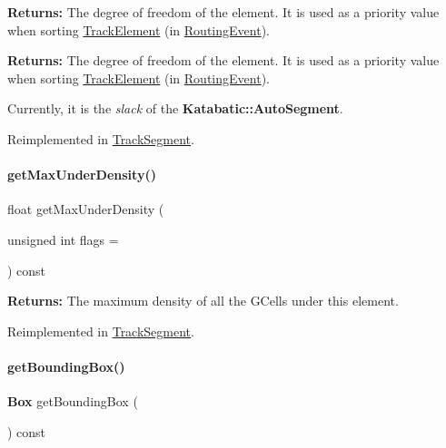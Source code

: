 {\bfseries Returns\+:} The degree of freedom of the element. It is used as a priority value when sorting \hyperlink{classKite_1_1TrackElement}{Track\+Element} (in \hyperlink{classKite_1_1RoutingEvent}{Routing\+Event}).

{\bfseries Returns\+:} The degree of freedom of the element. It is used as a priority value when sorting \hyperlink{classKite_1_1TrackElement}{Track\+Element} (in \hyperlink{classKite_1_1RoutingEvent}{Routing\+Event}).

Currently, it is the {\itshape slack} of the \textbf{ Katabatic\+::\+Auto\+Segment}. 

Reimplemented in \hyperlink{classKite_1_1TrackSegment_aa7552c20cc46abcac558627b2ca341f8}{Track\+Segment}.

\mbox{\label{classKite_1_1TrackElement_aa34ceb4288e76357b65725ca00e56df8}} 
\paragraph{\texorpdfstring{get\+Max\+Under\+Density()}{getMaxUnderDensity()}}
{\footnotesize\ttfamily float get\+Max\+Under\+Density (\begin{DoxyParamCaption}\item[{unsigned int}]{flags = {} }\end{DoxyParamCaption}) const\hspace{0.3cm}{\ttfamily [virtual]}}

{\bfseries Returns\+:} The maximum density of all the G\+Cells under this element. 

Reimplemented in \hyperlink{classKite_1_1TrackSegment_abb61228ad7b29c19c6428902d34126f7}{Track\+Segment}.

\mbox{\label{classKite_1_1TrackElement_ab5d8bf98ab5af6fcfebea1b9f446d5d7}} 
\paragraph{\texorpdfstring{get\+Bounding\+Box()}{getBoundingBox()}}
{\footnotesize\ttfamily \textbf{ Box} get\+Bounding\+Box (\begin{DoxyParamCaption}{ }\end{DoxyParamCaption}) const\hspace{0.3cm}{\ttfamily [inline]}}

